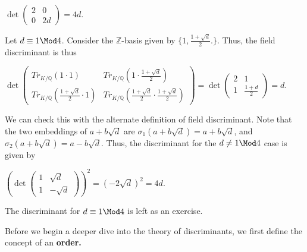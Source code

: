 \documentclass[a4paper, 12pt,oneside,openany]{book}
\begin{document}
$\det\begin{pmatrix}
    2 & 0 \\
    0 & 2d   
\end{pmatrix}=4d.$

Let $d \equiv 1 \Mod 4$. Consider the $\mathbb{Z}$-basis given by $\{1, \frac{1+\sqrt{d}}{2}.\}$. Thus, the field discriminant is thus

$\det\begin{pmatrix}
    Tr_{K/\mathbb{Q}}(1\cdot 1) & Tr_{K/\mathbb{Q}}(1\cdot \frac{1+\sqrt{d}}{2}) \\
    Tr_{K/\mathbb{Q}}(\frac{1+\sqrt{d}}{2} \cdot 1) & Tr_{K/\mathbb{Q}}(\frac{1+\sqrt{d}}{2}\cdot \frac{1+\sqrt{d}}{2})
\end{pmatrix}=\det\begin{pmatrix}
    2 & 1 \\ 1 & \frac{1+d}{2}
\end{pmatrix}=d.$

We can check this with the alternate definition of field discriminant. Note that the two embeddings of $a+b\sqrt{d}$ are $\sigma_1(a+b\sqrt{d}) = a+b\sqrt{d}$, and $\sigma_2(a+b\sqrt{d})=a-b\sqrt{d}$. Thus, the discriminant for the $d \neq 1 \Mod 4$ case is given by 

$\left(\det\begin{pmatrix}
    1 & \sqrt{d} \\ 1 & -\sqrt{d}
\end{pmatrix}\right)^2=(-2\sqrt{d})^2=4d$. 

The discriminant for $d \equiv 1 \Mod 4$ is left as an exercise.

Before we begin a deeper dive into the theory of discriminants, we first define the concept of an \textbf{order.}



\end{document}
